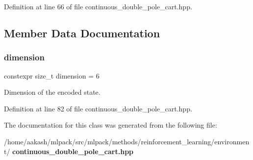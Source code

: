 Definition at line 66 of file continuous\+\_\+double\+\_\+pole\+\_\+cart.\+hpp.



\subsection{Member Data Documentation}
\mbox{\label{classmlpack_1_1rl_1_1ContinuousDoublePoleCart_1_1State_ae813298f34ef9d793885fc04b54dff99}} 
\subsubsection{dimension}
{\footnotesize\ttfamily constexpr size\+\_\+t dimension = 6\hspace{0.3cm}{\ttfamily [static]}}



Dimension of the encoded state. 



Definition at line 82 of file continuous\+\_\+double\+\_\+pole\+\_\+cart.\+hpp.



The documentation for this class was generated from the following file\+:\begin{DoxyCompactItemize}
\item 
/home/aakash/mlpack/src/mlpack/methods/reinforcement\+\_\+learning/environment/\textbf{ continuous\+\_\+double\+\_\+pole\+\_\+cart.\+hpp}\end{DoxyCompactItemize}
